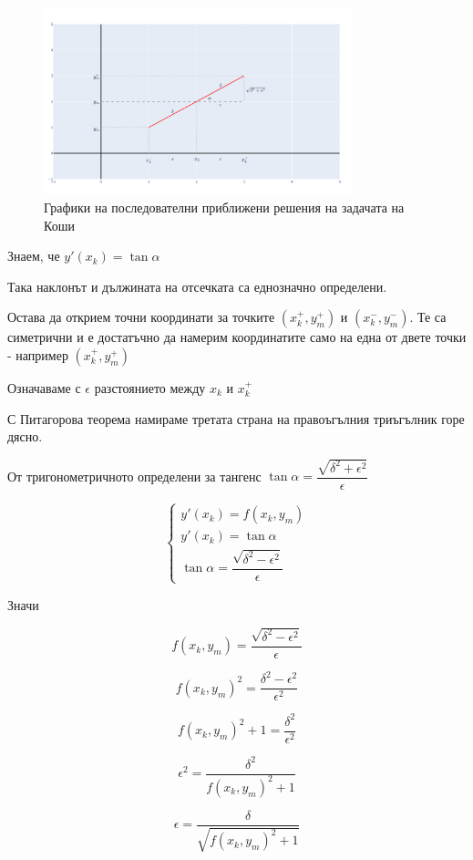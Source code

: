 \documentclass{scrartcl}
\begin{document}
\begin{figure}[H]
    \centering
    \includegraphics[width=0.8\textwidth]{slope_field_theory_picture.png}
    \caption{Графики на последователни приближени решения на задачата на Коши}
    \label{fig:slope_field_theory_picture}
\end{figure}

Знаем, че $y'(x_k) = \tan{\alpha}$

Така наклонът и дължината на отсечката са еднозначно определени.

Остава да открием точни координати за точките $(x_k^+, y_m^+)$ и $(x_k^-, y_m^-)$. Те са симетрични и е достатъчно да намерим координатите само на една от двете точки - например $(x_k^+, y_m^+)$

Означаваме с $\epsilon$ разстоянието между $x_k$ и $x_k^+$

С Питагорова теорема намираме третата страна на правоъгълния триъгълник горе дясно.

От тригонометричното определени за тангенс $\tan{\alpha} = \dfrac{\sqrt{\delta^2 + \epsilon^2}}{\epsilon}$

$$
\begin{cases}
y'(x_k) = f(x_k, y_m)\\
y'(x_k) = \tan{\alpha}\\
\tan{\alpha} = \dfrac{\sqrt{\delta^2 - \epsilon^2}}{\epsilon}
\end{cases}
$$

Значи

$$f(x_k, y_m) = \dfrac{\sqrt{\delta^2 - \epsilon^2}}{\epsilon}$$

$$f(x_k, y_m)^2 = \dfrac{\delta^2 - \epsilon^2}{\epsilon^2}$$

$$f(x_k, y_m)^2 + 1= \dfrac{\delta^2}{\epsilon^2}$$

$$\epsilon^2= \dfrac{\delta^2}{f(x_k, y_m)^2 + 1}$$

$$\epsilon= \dfrac{\delta}{\sqrt{f(x_k, y_m)^2 + 1}}$$
\end{document}
